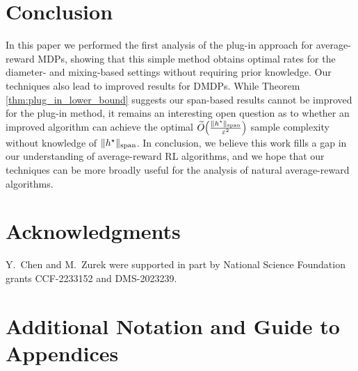\documentclass{article}
\theoremstyle{plain}
\theoremstyle{plain}
\theoremstyle{remark}
\theoremstyle{plain}
\theoremstyle{plain}
\newcommand{\Otilde}{\widetilde{O}}
\newcommand\cig[1]{\scalerel*[5.5pt]{\Big#1}{%
  \ensurestackMath{\addstackgap[1.5pt]{\big#1}}}}
\newcommand{\plugin}{plug-in\xspace}
\begin{document}
\section{Conclusion}
In this paper we performed the first analysis of the \plugin approach for average-reward MDPs, showing that this simple method obtains optimal rates for the diameter- and mixing-based settings without requiring prior knowledge. Our techniques also lead to improved results for DMDPs. While Theorem \ref{thm:plug_in_lower_bound} suggests our span-based results cannot be improved for the \plugin method, it remains an interesting open question as to whether an improved algorithm can achieve the optimal $\Otilde\cig(\frac{\spannorm{h^\star}}{\varepsilon^2} \cig)$ sample complexity without knowledge of $\Vert h^\star\Vert _{\textnormal{span}}$. In conclusion, we believe this work fills a gap in our understanding of average-reward RL algorithms, and we hope that our techniques can be more broadly useful for the analysis of natural average-reward algorithms.

\section*{Acknowledgments}
{Y.\ Chen and M.\ Zurek were supported in part by National Science Foundation grants CCF-2233152 and DMS-2023239.}


%
%



\clearpage


\appendix



\section{Additional Notation and Guide to Appendices}
\end{document}

